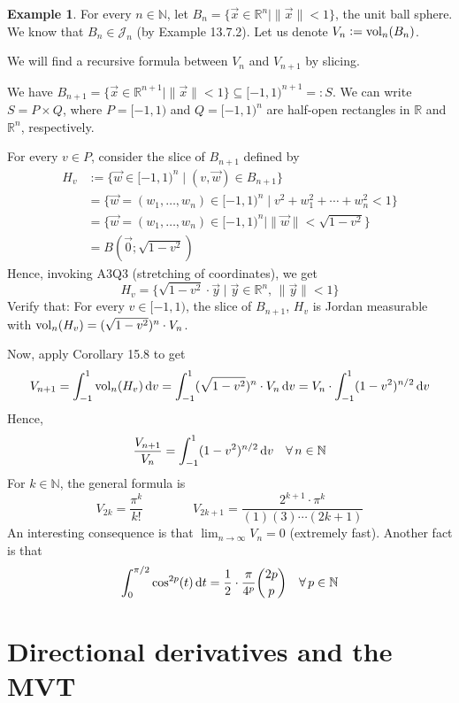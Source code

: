 \documentclass[11pt]{article}
\theoremstyle{definition}
\newtheorem{exmp}[thm]{Example}
\newcommand{\N}{\ensuremath{\mathbb{N}}}
\newcommand{\R}{\ensuremath{\mathbb{R}}}
\begin{document}
\begin{exmp}
For every $n \in \N$, let $B_n = \{\vec{x} \in \R^n \mid \|\vec{x}\| < 1\}$, the unit ball sphere. We know that $B_n \in \mathcal{J}_n$ (by Example 13.7.2). Let us denote $V_n := {\rm vol}_n(B_n)$. 

We will find a recursive formula between $V_n$ and $V_{n+1}$ by slicing. 

We have $B_{n+1} = \{\vec{x} \in \R^{n+1} \mid \|\vec{x}\| < 1\} \subseteq [-1, 1)^{n+1} =: S$. We can write $S = P \times Q$, where $P = [-1, 1)$ and $Q = [-1, 1)^n$ are half-open rectangles in $\R$ and $\R^n$, respectively.

For every $v \in P$, consider the slice of $B_{n+1}$ defined by
\begin{align*}
    H_v &:= \{\vec{w} \in [-1, 1)^n \mid (v, \vec{w}) \in B_{n+1}\} \\
    &= \{\vec{w} = (w_1, \dots, w_n) \in [-1, 1)^n \mid v^2 + w_1^2 + \cdots + w_n^2 < 1\} \\
    &= \{\vec{w} = (w_1, \dots, w_n) \in [-1, 1)^n \mid \|\vec{w}\| < \sqrt{1 - v^2}\} \\
    &= B(\vec{0}; \sqrt{1 - v^2})
\end{align*}
Hence, invoking A3Q3 (stretching of coordinates), we get
$$H_v = \{ \sqrt{1 - v^2} \cdot \vec{y} \mid \vec{y} \in \R^n,\, \|\vec{y}\| < 1\}$$
Verify that: For every $v \in [-1, 1)$, the slice of $B_{n+1}$, $H_v$ is Jordan measurable with ${\rm vol}_n(H_v) = (\sqrt{1-v^2})^n \cdot V_n$.

Now, apply Corollary 15.8 to get
$$V_{n+1} = \int_{-1}^1 {\rm vol}_n(H_v)\,{\rm d}v = \int_{-1}^1 (\sqrt{1-v^2})^n \cdot V_n\,{\rm d}v = V_n \cdot \int_{-1}^1 (1-v^2)^{n/2}\,{\rm d}v$$
Hence,
$$\frac{V_{n+1}}{V_n} = \int_{-1}^1 (1-v^2)^{n/2}\,{\rm d}v \quad \forall \, n \in \N$$
For $k \in \N$, the general formula is
$$V_{2k} = \frac{\pi^k}{k!} \qquad \qquad V_{2k+1} = \frac{2^{k+1} \cdot \pi^k}{(1)(3) \cdots (2k+1)}$$
An interesting consequence is that $\lim_{n\to\infty} V_n = 0$ (extremely fast). Another fact is that
$$\int_0^{\pi/2} \cos^{2p}(t)\,{\rm d}t = \frac12 \cdot \frac{\pi}{4^p} \binom{2p}p \quad \forall \, p \in \N$$
\end{exmp}

\newpage
{}
\section{Directional derivatives and the MVT}
\end{document}
